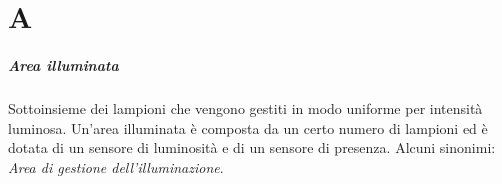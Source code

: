 \chapter{A}

\paragraph*{Area illuminata}
Sottoinsieme dei lampioni che vengono gestiti in modo uniforme per intensità luminosa. Un'area illuminata è composta da un certo numero di lampioni ed è dotata di un sensore di luminosità e di un sensore di presenza. Alcuni sinonimi: \textit{Area di gestione dell'illuminazione}.
